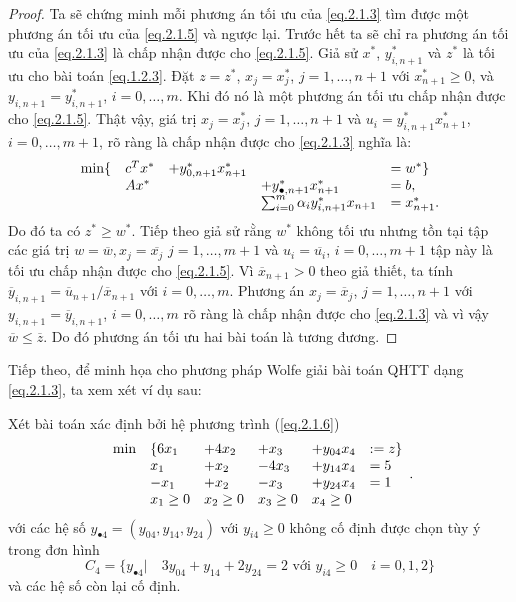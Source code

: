 \begin{proof}
Ta sẽ chứng minh mỗi phương án tối ưu của \eqref{eq.2.1.3} tìm được một phương án tối ưu của \eqref{eq.2.1.5} và ngược lại. 
Trước hết ta sẽ chỉ ra phương án tối ưu của \eqref{eq.2.1.3} là chấp nhận được cho \eqref{eq.2.1.5}. Giả sử $x^{*}$, $y_{i, n+1}^{*}$ và $z^{*}$ là tối ưu cho bài toán \eqref{eq.1.2.3}. Đặt $z=z^\ast$, $x_j=x_j^\ast$, $j=1,\dots,n+1$ với $x_{n+1}^\ast\geq 0$, và $y_{i,n+1}=y_{i,n+1}^\ast$, $i=0,\dots,m$. Khi đó nó là một phương án tối ưu chấp nhận được cho \eqref{eq.2.1.5}. Thật vậy, giá trị $x_j=x_j^\ast$, $j=1,\dots,n+1$ và $u_i=y_{i,n+1}^\ast x_{n+1}^\ast$, $i=0,\dots,m+1$, rõ ràng là chấp nhận được cho \eqref{eq.2.1.3} nghĩa là:
\begin{equation}\label{2.1.5a}
\begin{array}{llllll}
\min\{&c^Tx^\ast&+y_{0,n+1}^\ast x^\ast_{n+1}&&=w^\ast\}\\
&Ax^\ast&&+y_{\bullet,n+1}^\ast x^\ast_{n+1}&=b,\\
&&&\sum_{i=0}^m\alpha_iy^\ast_{i,n+1}x_{n+1}&=x_{n+1}^\ast.
\end{array}
\end{equation}
Do đó ta có $z^\ast\geq w^\ast$. 
Tiếp theo giả sử rằng $w^\ast$ không tối ưu nhưng tồn tại tập các giá trị $w=\overline{w},x_j=\overline{x_j}$ $j=1,\dots,m+1$ và $u_i=\overline{u_i}$, $i=0,\dots,m+1$ tập này là tối ưu chấp nhận được cho \eqref{eq.2.1.5}. Vì $\overline x_{n+1}>0$ theo giả thiết, ta tính $\overline y_{i,n+1}=\overline u_{n+1}/\overline x_{n+1}$ với $i=0,\dots,m$. Phương án $x_j=\overline x_j$, $j=1,\dots,n+1$ với $y_{i,n+1}=\overline y_{i,n+1}$, $i=0,\dots,m$ rõ ràng là chấp nhận được cho \eqref{eq.2.1.3} và vì vậy $\overline{w}\leq \overline{z}$. Do đó phương án tối ưu hai bài toán là tương đương. 
\end{proof}

Tiếp theo, để minh họa cho phương pháp Wolfe giải bài toán QHTT dạng \eqref{eq.2.1.3}, ta xem xét ví dụ sau:

Xét bài toán xác định bởi hệ phương trình (\ref{eq.2.1.6})
\begin{equation}\label{eq.2.1.6}
\begin{array}{llllll}
\min&\{6x_1&+4x_2&+x_3&+y_{04}x_4 & :=z\}\\
&x_1&+x_2&-4x_3&+y_{14}x_4&=5\\
&-x_1&+x_2&-x_3&+y_{24}x_4&=1\\
&x_1\geq 0&x_2\geq 0&x_3\geq 0&x_4\geq 0
\end{array}.
\end{equation} 
với các hệ số $y_{\bullet4}=(y_{04},y_{14},y_{24})$ với $y_{i4}\geq0$ không cố định được chọn tùy ý trong đơn hình
\begin{equation}\label{eq.2.1.7}
C_4=\{y_{\bullet4}|\quad 3y_{04}+y_{14}+2y_{24}=2\textrm{ với } y_{i4}\geq 0\quad i=0,1,2\}
\end{equation}
và các hệ số còn lại cố định.

